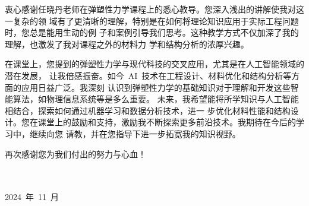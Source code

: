 衷心感谢任晓丹老师在弹塑性力学课程上的悉心教导。您深入浅出的讲解使我对这一复杂的领
域有了更清晰的理解，特别是在如何将理论知识应用于实际工程问题时，您总是能用生动的例
子和案例引导我们思考。这种教学方式不仅加深了我的理解，也激发了我对课程之外的材料力
学和结构分析的浓厚兴趣。

在课堂上，您提到的弹塑性力学与现代科技的交叉应用，尤其是在人工智能领域的潜在发展，
让我倍感振奋。如今~AI~技术在工程设计、材料优化和结构分析等方面的应用日益广泛。我深刻
认识到弹塑性力学的基础知识对于理解和开发这些智能算法，如物理信息系统等是多么重要。
未来，我希望能将所学知识与人工智能相结合，探索如何通过机器学习和数据分析技术，进一
步优化材料性能和结构设计。您在课堂上的鼓励和支持，激励我不断探索更多前沿技术。我期待在今后的学习中，继续向您
请教，并在您指导下进一步拓宽我的知识视野。

再次感谢您为我们付出的努力与心血！
\\
\\
\\
\begin{flushright}
2024~年~11~月
\end{flushright}